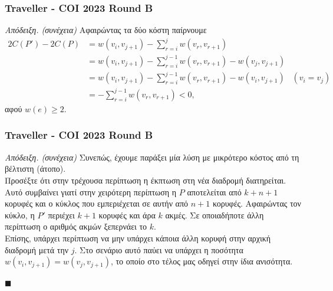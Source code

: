 \documentclass[t]{beamer}
\begin{document}
\begin{frame}
	\frametitle{Traveller - COI 2023 Round B}
	\begin{block}{\emph{Απόδειξη. (συνέχεια)}}	
		Αφαιρώντας τα δύο κόστη παίρνουμε 
		\begin{align*}
			2C(P') - 2C(P) &= w(v_i, v_{j + 1}) - \sum_{r = i}^{j} w(v_r, v_{r + 1}) \\
			&= w(v_i, v_{j + 1}) - \sum_{r = i}^{j - 1} w(v_r, v_{r + 1}) - w(v_j, v_{j + 1}) \\
			&= w(v_i, v_{j + 1}) - \sum_{r = i}^{j - 1} w(v_r, v_{r + 1}) - w(v_i, v_{j + 1}) & (v_i = v_j) \\
			&= -\sum_{r = i}^{j - 1} w(v_r, v_{r + 1}) < 0, 
			\end{align*}
			αφού  $w(e) \geq 2$.
	\end{block}
\end{frame}

\begin{frame}
	\frametitle{Traveller - COI 2023 Round B}
	\begin{block}{\emph{Απόδειξη. (συνέχεια)}}
		Συνεπώς, έχουμε παράξει μία λύση με μικρότερο κόστος από τη βέλτιστη (άτοπο). 
		\pause 
		\\
		\vspace{0.25cm}
		Προσέξτε ότι στην τρέχουσα περίπτωση η έκπτωση στη νέα διαδρομή διατηρείται. Αυτό συμβαίνει γιατί στην χειρότερη περίπτωση η $P$ αποτελείται από $k + n + 1$ κορυφές
		και ο κύκλος που εμπεριέχεται σε αυτήν από $n + 1$ κορυφές. Αφαιρώντας τον κύκλο, η $P'$ περιέχει $k + 1$ κορυφές και άρα $k$ ακμές. Σε οποιαδήποτε άλλη περίπτωση 
		ο αριθμός ακμών ξεπερνάει το $k$.
		\pause
		\\
		\vspace{0.25cm}
		Επίσης, υπάρχει περίπτωση να μην υπάρχει κάποια άλλη κορυφή στην αρχική διαδρομή μετά την $j$. Στο σενάριο αυτό παύει να υπάρχει η ποσότητα 
			$w(v_i, v_{j + 1}) = w(v_{j}, v_{j + 1})$,
		το οποίο στο τέλος μας οδηγεί στην ίδια ανισότητα.
		\begin{flushright}
			$\blacksquare$
		\end{flushright}
	\end{block}
\end{frame}
\end{document}
